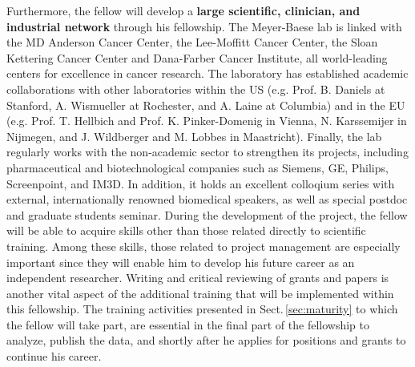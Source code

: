 Furthermore, the fellow will develop a \textbf{large scientific, clinician, and industrial network} through his fellowship.
The Meyer-Baese lab is linked with the MD Anderson Cancer Center, the Lee-Moffitt Cancer Center, the Sloan Kettering Cancer Center and Dana-Farber Cancer Institute, all world-leading centers for excellence in cancer research.
The laboratory has established academic collaborations with other laboratories within the US (e.g. Prof. B. Daniels at Stanford, A. Wismueller at Rochester, and A. Laine at Columbia) and in the EU (e.g. Prof. T. Hellbich and Prof. K. Pinker-Domenig in Vienna, N. Karssemijer in Nijmegen, and J. Wildberger and M. Lobbes in Maastricht).
Finally, the lab regularly works with the non-academic sector to strengthen its projects, including pharmaceutical and biotechnological companies such as Siemens, GE, Philips, Screenpoint, and IM3D.
In addition, it holds an excellent colloqium series with external, internationally renowned biomedical speakers, as well as special postdoc and graduate students seminar.
During the development of the project, the fellow will be able to acquire skills other than those related directly to scientific training.
Among these skills, those related to project management are especially important since they will enable him to develop his future career as an independent researcher.
Writing and critical reviewing of grants and papers is another vital aspect of the additional training that will be implemented within this fellowship.
The training activities presented in Sect.\,\ref{sec:maturity} to which the fellow will take part, are essential in the final part of the fellowship to analyze, publish the data, and shortly after he applies for positions and grants to continue his career.

